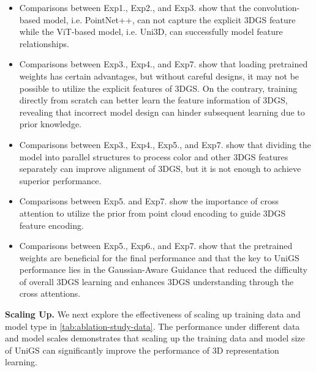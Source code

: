 \begin{itemize}
    \item Comparisons between Exp1., Exp2., and Exp3. show that the convolution-based model, i.e. PointNet++, can not capture the explicit 3DGS feature while the ViT-based model, i.e. Uni3D, can successfully model feature relationships.
    \item Comparisons between Exp3., Exp4., and Exp7. show that loading pretrained weights has certain advantages, but without careful designs, it may not be possible to utilize the explicit features of 3DGS. On the contrary, training directly from scratch can better learn the feature information of 3DGS, revealing that incorrect model design can hinder subsequent learning due to prior knowledge.
    \item  Comparisons between Exp3., Exp4., Exp5., and Exp7. show that dividing the model into parallel structures to process color and other 3DGS features separately can improve alignment of 3DGS, but it is not enough to achieve superior performance.
    \item  Comparisons between Exp5. and Exp7. show the importance of cross attention to utilize the prior from point cloud encoding to guide 3DGS feature encoding.
    \item  Comparisons between Exp5., Exp6., and Exp7. show that the pretrained weights are beneficial for the final performance and that the key to UniGS performance lies in the Gaussian-Aware Guidance that reduced the difficulty of overall 3DGS learning and enhances 3DGS understanding through the cross attentions.
\end{itemize}

\textbf{Scaling Up.} 
We next explore the effectiveness of scaling up training data and model type in \cref{tab:ablation-study-data}. The performance under different data and model scales demonstrates that scaling up the training data and model size of UniGS can significantly improve the performance of 3D representation learning.

